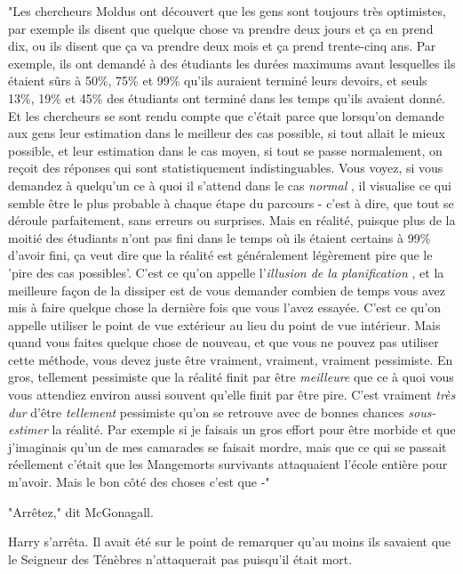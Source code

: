 "Les chercheurs Moldus ont découvert que les gens sont toujours très optimistes, par exemple ils disent que quelque chose va prendre deux jours et ça en prend dix, ou ils disent que ça va prendre deux mois et ça prend trente-cinq ans. Par exemple, ils ont demandé à des étudiants les durées maximums avant lesquelles ils étaient sûrs à 50\%, 75\% et 99\% qu'ils auraient terminé leurs devoirs, et seuls 13\%, 19\% et 45\% des étudiants ont terminé dans les temps qu'ils avaient donné. Et les chercheurs se sont rendu compte que c'était parce que lorsqu'on demande aux gens leur estimation dans le meilleur des cas possible, si tout allait le mieux possible, et leur estimation dans le cas moyen, si tout se passe normalement, on reçoit des réponses qui sont statistiquement indistinguables. Vous voyez, si vous demandez à quelqu'un ce à quoi il s'attend dans le cas \emph{normal} , il visualise ce qui semble être le plus probable à chaque étape du parcours - c'est à dire, que tout se déroule parfaitement, sans erreurs ou surprises. Mais en réalité, puisque plus de la moitié des étudiants n'ont pas fini dans le temps où ils étaient certains à 99\% d'avoir fini, ça veut dire que la réalité est généralement légèrement pire que le 'pire des cas possibles'. C'est ce qu'on appelle l'\emph{illusion de la planification} , et la meilleure façon de la dissiper est de vous demander combien de temps vous avez mis à faire quelque chose la dernière fois que vous l'avez essayée. C'est ce qu'on appelle utiliser le point de vue extérieur au lieu du point de vue intérieur. Mais quand vous faites quelque chose de nouveau, et que vous ne pouvez pas utiliser cette méthode, vous devez juste être vraiment, vraiment, vraiment pessimiste. En gros, tellement pessimiste que la réalité finit par être \emph{meilleure}  que ce à quoi vous vous attendiez environ aussi souvent qu'elle finit par être pire. C'est vraiment \emph{très dur}  d'être \emph{tellement}  pessimiste qu'on se retrouve avec de bonnes chances \emph{sous-estimer}  la réalité. Par exemple si je faisais un gros effort pour être morbide et que j'imaginais qu'un de mes camarades se faisait mordre, mais que ce qui se passait réellement c'était que les Mangemorts survivants attaquaient l'école entière pour m'avoir. Mais le bon côté des choses c'est que -"

"Arrêtez," dit McGonagall.

Harry s'arrêta. Il avait été sur le point de remarquer qu'au moins ils savaient que le Seigneur des Ténèbres n'attaquerait pas puisqu'il était mort.

